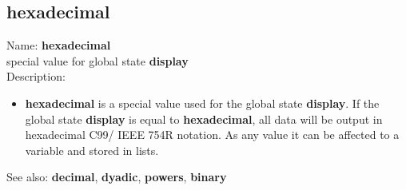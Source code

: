 \subsection{ hexadecimal }
\noindent Name: \textbf{hexadecimal}\\
special value for global state \textbf{display}\\

\noindent Description: \begin{itemize}

\item \textbf{hexadecimal} is a special value used for the global state \textbf{display}.  If
   the global state \textbf{display} is equal to \textbf{hexadecimal}, all data will be
   output in hexadecimal C99/ IEEE 754R notation.
   As any value it can be affected to a variable and stored in lists.
\end{itemize}
See also: \textbf{decimal}, \textbf{dyadic}, \textbf{powers}, \textbf{binary}
